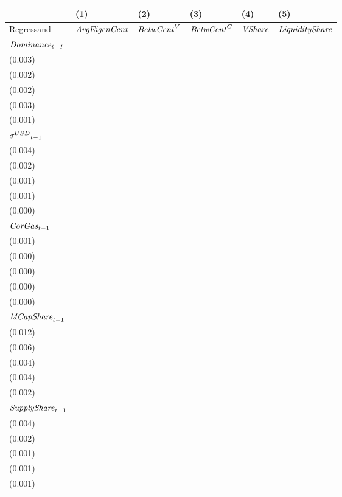 \begin{tabular}{llllll}
\toprule
{} &                                   (1) &                                   (2) &                                   (3) &                                   (4) &                                   (5) \\
\midrule
Regressand                   &                  ${\it AvgEigenCent}$ &                    ${\it BetwCent}^V$ &                    ${\it BetwCent}^C$ &                        ${\it VShare}$ &                ${\it LiquidityShare}$ \\
$\it Dominance_{t-1}$        &   \makecell{$0.828^{***}$ \\ (0.003)} &   \makecell{$0.963^{***}$ \\ (0.002)} &   \makecell{$0.957^{***}$ \\ (0.002)} &   \makecell{$0.896^{***}$ \\ (0.003)} &   \makecell{$0.900^{***}$ \\ (0.001)} \\
${{\it \sigma}^{USD}}_{t-1}$ &   \makecell{$0.013^{***}$ \\ (0.004)} &     \makecell{$-0.000^{}$ \\ (0.002)} &     \makecell{$-0.000^{}$ \\ (0.001)} &      \makecell{$0.001^{}$ \\ (0.001)} &     \makecell{$-0.000^{}$ \\ (0.000)} \\
${{\it CorGas}}_{t-1}$       &     \makecell{$-0.000^{}$ \\ (0.001)} &     \makecell{$-0.000^{}$ \\ (0.000)} &     \makecell{$-0.000^{}$ \\ (0.000)} &     \makecell{$-0.000^{}$ \\ (0.000)} &     \makecell{$-0.000^{}$ \\ (0.000)} \\
${{\it MCapShare}}_{t-1}$    &      \makecell{$0.019^{}$ \\ (0.012)} &   \makecell{$0.061^{***}$ \\ (0.006)} &   \makecell{$0.048^{***}$ \\ (0.004)} &   \makecell{$0.047^{***}$ \\ (0.004)} &   \makecell{$0.057^{***}$ \\ (0.002)} \\
${{\it SupplyShare}}_{t-1}$  &   \makecell{$0.038^{***}$ \\ (0.004)} &   \makecell{$0.008^{***}$ \\ (0.002)} &   \makecell{$0.005^{***}$ \\ (0.001)} &   \makecell{$0.014^{***}$ \\ (0.001)} &   \makecell{$0.003^{***}$ \\ (0.001)} \\

\end{tabular}
